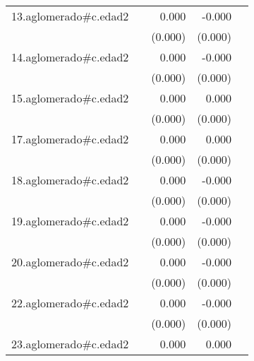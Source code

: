 {\begin{longtable}{l*{4}{D{.}{.}{-1}}}
\addlinespace
13.aglomerado#c.edad2&                     &       0.000\sym{***}&      -0.000         &                     \\
            &                     &     (0.000)         &     (0.000)         &                     \\
\addlinespace
14.aglomerado#c.edad2&                     &       0.000         &      -0.000\sym{***}&                     \\
            &                     &     (0.000)         &     (0.000)         &                     \\
\addlinespace
15.aglomerado#c.edad2&                     &       0.000         &       0.000         &                     \\
            &                     &     (0.000)         &     (0.000)         &                     \\
\addlinespace
17.aglomerado#c.edad2&                     &       0.000\sym{**} &       0.000         &                     \\
            &                     &     (0.000)         &     (0.000)         &                     \\
\addlinespace
18.aglomerado#c.edad2&                     &       0.000         &      -0.000\sym{*}  &                     \\
            &                     &     (0.000)         &     (0.000)         &                     \\
\addlinespace
19.aglomerado#c.edad2&                     &       0.000\sym{**} &      -0.000         &                     \\
            &                     &     (0.000)         &     (0.000)         &                     \\
\addlinespace
20.aglomerado#c.edad2&                     &       0.000         &      -0.000\sym{**} &                     \\
            &                     &     (0.000)         &     (0.000)         &                     \\
\addlinespace
22.aglomerado#c.edad2&                     &       0.000\sym{*}  &      -0.000         &                     \\
            &                     &     (0.000)         &     (0.000)         &                     \\
\addlinespace
23.aglomerado#c.edad2&                     &       0.000\sym{***}&       0.000         &                     \\

\end{longtable}}
